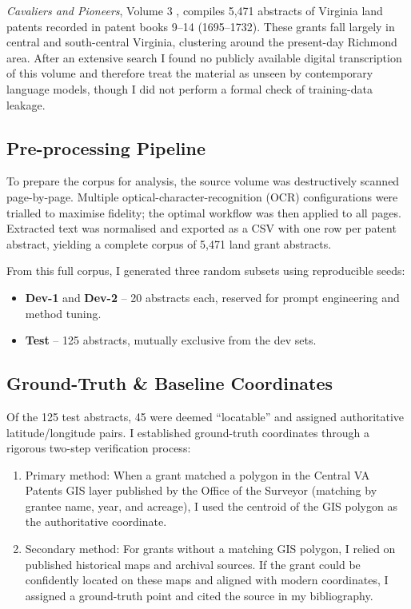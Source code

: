 \emph{Cavaliers and Pioneers}, Volume 3 \citep{Nugent1979_cavaliers3},
compiles 5,471 abstracts of Virginia land patents recorded in patent
books 9--14 (1695--1732). These grants fall largely in central and
south-central Virginia, clustering around the present-day Richmond area.
After an extensive search I found no publicly available digital
transcription of this volume and therefore treat the material as unseen
by contemporary language models, though I did not perform a formal check
of training-data leakage.

\subsection{Pre-processing Pipeline}\label{pre-processing-pipeline}

To prepare the corpus for analysis, the source volume was destructively
scanned page-by-page. Multiple optical-character-recognition (OCR)
configurations were trialled to maximise fidelity; the optimal workflow
was then applied to all pages. Extracted text was normalised and
exported as a CSV with one row per patent abstract, yielding a complete
corpus of 5,471 land grant abstracts.

From this full corpus, I generated three random subsets using
reproducible seeds:

\begin{itemize}
\tightlist
\item
  \textbf{Dev-1} and \textbf{Dev-2} -- 20 abstracts each, reserved for
  prompt engineering and method tuning.
\item
  \textbf{Test} -- 125 abstracts, mutually exclusive from the dev sets.
\end{itemize}

\subsection{Ground-Truth \& Baseline
Coordinates}\label{ground-truth-baseline-coordinates}

Of the 125 test abstracts, 45 were deemed ``locatable'' and assigned
authoritative latitude/longitude pairs. I established ground-truth
coordinates through a rigorous two-step verification process:

\begin{enumerate}
\def\labelenumi{\arabic{enumi}.}
\item
  Primary method: When a grant matched a polygon in the Central VA
  Patents GIS layer published by the Office of the Surveyor (matching by
  grantee name, year, and acreage), I used the centroid of the GIS
  polygon as the authoritative coordinate.
\item
  Secondary method: For grants without a matching GIS polygon, I relied
  on published historical maps and archival sources. If the grant could
  be confidently located on these maps and aligned with modern
  coordinates, I assigned a ground-truth point and cited the source in
  my bibliography.
\end{enumerate}

